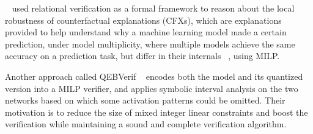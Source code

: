 ~\cite{CFXROBUSTNESS} used relational verification as a formal framework to reason about the local robustness of counterfactual explanations (CFXs), which are explanations provided to help understand why a machine learning model made a certain prediction, under model multiplicity, where multiple models achieve the same accuracy on a prediction task, but differ in their internals ~\cite{PREDICTIVEMULTIPICITY}, using MILP.

Another approach called QEBVerif ~\cite{QEBVERIF} encodes both the model and its quantized version into a MILP verifier, and applies symbolic interval analysis on the two networks based on which some activation patterns could be omitted. Their motivation is to reduce the size of mixed integer linear constraints and boost the verification while maintaining a sound and complete verification algorithm. 